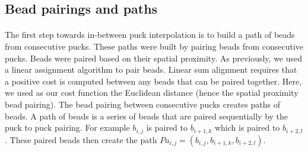 \documentclass[10pt,a4paper]{article}
\begin{document}
\subsection{Bead pairings and paths}
\paragraph{}The first step towards in-between puck interpolation is to build a path of beads from consecutive pucks.
These paths were built by pairing beads from consecutive pucks.
Beads were paired based on their spatial proximity.
As previously, we used a linear assignment algorithm to pair beads.
Linear sum alignment requires that a positive cost is computed between any beads that can be paired together.
Here, we used as our cost function the Euclidean distance (hence the spatial proximity bead pairing).
The bead pairing between consecutive pucks creates paths of beads. A path of beads is a series of beads that are paired sequentially by the puck to puck pairing.
For example \(b_{i,j}\) is paired to \(b_{i+1,k}\) which is paired to \(b_{i+2,l}\). These paired beads then create the path \(Pa_{i,j}=(b_{i,j}, b_{i+1,k},b_{i+2,l})\).
\end{document}
